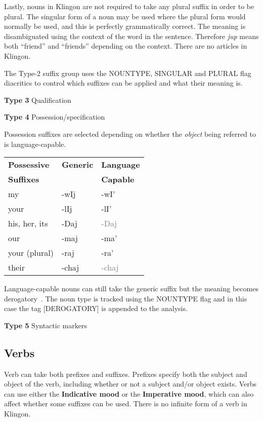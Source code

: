 \documentclass[11pt]{article}
\begin{document}
Lastly, nouns in Klingon are not required to take any plural suffix in order to be plural. The singular form of a noun may be used where the plural form would normally be used, and this is perfectly grammatically correct. The meaning is disambiguated using the context of the word in the sentence. Therefore \textit{jup} means both ``friend'' and ``friends'' depending on the context. There are no articles in Klingon.
	
The Type-2 suffix group uses the NOUNTYPE, SINGULAR and PLURAL flag diacritics to control which suffixes can be applied and what their meaning is.

\textbf{Type 3} Qualification
	
\textbf{Type 4} Possession/specification
	
Possession suffixes are selected depending on whether the \textit{object} being referred to is language-capable.

	\begin{center}
	\begin{tabular}{lll}
	\toprule
	\bf{Possessive} & \bf{Generic} & \bf{Language} \\
	\bf{Suffixes} & & \bf{Capable} \\
	\midrule
	my & -wIj & -wI' \\ \hline
	your & -lIj & -lI' \\ \hline
	his, her, its & -Daj & \textcolor{gray}{-Daj} \\ \hline
	our & -maj & -ma' \\ \hline
	your (plural) & -raj & -ra' \\ \hline
	their & -chaj & \textcolor{gray}{-chaj} \\
	\bottomrule
	\end{tabular}
	\end{center}
	
Language-capable nouns can still take the generic suffix but the meaning becomes derogatory~\cite{Okrand:92}. The noun type is tracked using the NOUNTYPE flag and in this case the tag [DEROGATORY] is appended to the analysis.

\textbf{Type 5} Syntactic markers

\subsection {Verbs}

Verb can take both prefixes and suffixes. Prefixes specify both the subject and object of the verb, including whether or not a subject and/or object exists. Verbs can use either the \textbf{Indicative mood} or the \textbf{Imperative mood}, which can also affect whether some suffixes can be used. There is no infinite form of a verb in Klingon.
\end{document}
